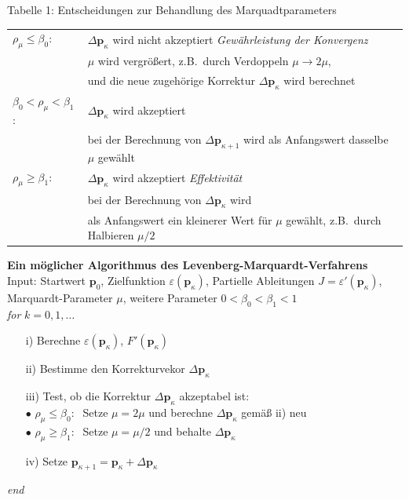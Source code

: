 Tabelle 1: Entscheidungen zur Behandlung des Marquadtparameters

\begin{tabular}{ll}
\hline\hline
$\rho_{\mu} \le \beta_0 $: &
$\Delta \mathbf{p}_\kappa$ wird nicht akzeptiert \textsl{Gewährleistung der Konvergenz} \\
 & $\mu$ wird vergrößert, z.B.\ durch Verdoppeln  $\mu \rightarrow 2 \mu$,\\
 & und die neue zugehörige Korrektur $\Delta \mathbf{p}_\kappa$ wird berechnet\\
\hline
$\beta_0 < \rho_{\mu} < \beta_1$: & $\Delta \mathbf{p}_\kappa$ wird akzeptiert \\
 & bei der Berechnung von $\Delta \mathbf{p}_{\kappa+1}$
  wird als Anfangswert dasselbe $\mu$ gewählt \\ 
\hline
$\rho_{\mu} \ge \beta_1$: & $\Delta \mathbf{p}_\kappa$ wird akzeptiert \textsl{Effektivität}\\
 & bei der Berechnung  von $\Delta \mathbf{p}_\kappa$ wird \\ 
 & als Anfangswert ein kleinerer Wert für $\mu$ gewählt, z.B.\ durch Halbieren $\mu / 2$ \\
\hline\hline
\end{tabular}

\newpage
\textbf{Ein möglicher Algorithmus des Levenberg-Marquardt-Verfahrens} \\
Input: Startwert $\mathbf{p}_0$, Zielfunktion $\varepsilon(\mathbf{p}_{\kappa})$, Partielle Ableitungen $J=\varepsilon'(\mathbf{p}_{\kappa})$, Marquardt-Parameter $\mu$, weitere Parameter $0 < \beta_0 < \beta_1 < 1$  \\
\hspace*{1em} \textit{for} $k = 0,1, \ldots$
\begin{itemize}
	\item[i)] Berechne $\varepsilon(\mathbf{p}_{\kappa})$, $F'(\mathbf{p}_{\kappa})$ 
	\item[ii)] Bestimme den Korrekturvekor $\Delta \mathbf{p}_\kappa$ 
	\item[iii)] Test, ob die Korrektur $\Delta \mathbf{p}_\kappa$  akzeptabel ist: \\
	$\bullet$ $\rho_{\mu} \le \beta_0: \;$ Setze $\mu = 2 \mu $ und berechne $ \Delta \mathbf{p}_\kappa$ gemäß ii) neu \\
	$\bullet$  $\rho_{\mu} \ge \beta_1: \;$ Setze $\mu = \mu / 2 $ und behalte 
	$\Delta \mathbf{p}_\kappa$
	\item[iv)] Setze $\mathbf{p}_{\kappa +1} = \mathbf{p}_\kappa +  \Delta \mathbf{p}_\kappa $
\end{itemize}
\hspace*{1em} \textit{end} \\


